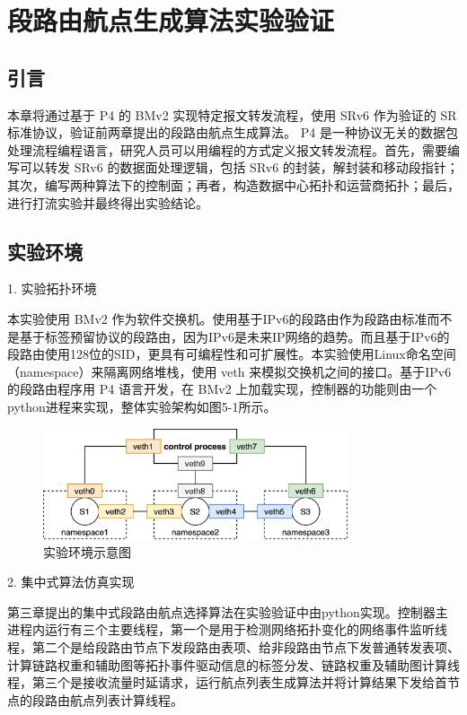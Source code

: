 \chapter{段路由航点生成算法实验验证}

\section{引言}

本章将通过基于 \gls*{P4} 的 \gls*{BMv2} 实现特定报文转发流程，使用 \gls*{SRv6} 作为验证的 \gls*{SR} 标准协议，验证前两章提出的段路由航点生成算法。 \gls*{P4} 是一种协议无关的数据包处理流程编程语言，研究人员可以用编程的方式定义报文转发流程。首先，需要编写可以转发 \gls*{SRv6} 的数据面处理逻辑，包括 \gls*{SRv6} 的封装，解封装和移动段指针；其次，编写两种算法下的控制面；再者，构造数据中心拓扑和运营商拓扑；最后，进行打流实验并最终得出实验结论。

\section{实验环境}

1. 实验拓扑环境

本实验使用 \gls*{BMv2} 作为软件交换机。使用基于IPv6的段路由作为段路由标准而不是基于标签预留协议的段路由，因为IPv6是未来IP网络的趋势。而且基于IPv6的段路由使用128位的SID，更具有可编程性和可扩展性。本实验使用Linux命名空间（namespace）来隔离网络堆栈，使用 \gls*{veth} 来模拟交换机之间的接口。基于IPv6的段路由程序用 \gls*{P4} 语言开发，在 \gls*{BMv2} 上加载实现，控制器的功能则由一个python进程来实现，整体实验架构如图5-1所示。

\begin{figure}[htbp]
\setlength{\abovecaptionskip}{15pt plus 3pt minus 2pt}
\centerline{\includegraphics[width=0.8\textwidth]{./figures/ch3-test-env.png}}
\caption{实验环境示意图}
\label{fig-ch3-test-env}
\end{figure}

2. 集中式算法仿真实现

第三章提出的集中式段路由航点选择算法在实验验证中由python实现。控制器主进程内运行有三个主要线程，第一个是用于检测网络拓扑变化的网络事件监听线程，第二个是给段路由节点下发段路由表项、给非段路由节点下发普通转发表项、计算链路权重和辅助图等拓扑事件驱动信息的标签分发、链路权重及辅助图计算线程，第三个是接收流量时延请求，运行航点列表生成算法并将计算结果下发给首节点的段路由航点列表计算线程。

